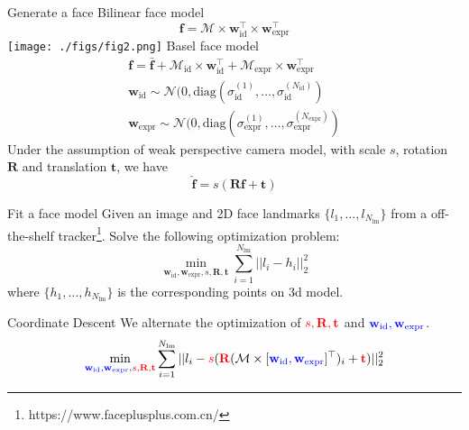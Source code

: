 \documentclass{beamer}
\begin{document}
\begin{frame}[allowframebreaks]{Generate a face}
Bilinear face model\cite{vlasic2005face}
$$\mathbf{f} = \mathcal{M} \times \mathbf{w}_{\text{id}}^\top \times \mathbf{w}_{\text{expr}}^\top$$
\texttt{[image: ./figs/fig2.png]}
Basel face model\cite{gerig2017morphable}
\begin{align*}
\mathbf{f} = \bar{\mathbf{f}} + \mathcal{M}_{\text{id}} \times \mathbf{w}_{\text{id}}^\top + \mathcal{M}_{\text{expr}}\times \mathbf{w}_{\text{expr}}^\top \\
\mathbf{w}_{\text{id}} \sim \mathcal{N}(0, \text{diag}(\sigma_{\text{id}}^{(1)}, \dots, \sigma_{\text{id}}^{(N_\text{id})}) \\ 
\mathbf{w}_{\text{expr}} \sim \mathcal{N}(0, \text{diag}(\sigma_{\text{expr}}^{(1)}, \dots, \sigma_{\text{expr}}^{(N_\text{expr})})
\end{align*}
Under the assumption of weak perspective camera model, with scale $s$, rotation $\mathbf{R}$ and translation $\mathbf{t}$, we have 
$$\hat{\mathbf{f}} = s (\mathbf{R} \mathbf{f} + \mathbf{t})$$

\end{frame}

\begin{frame}{Fit a face model}
Given an image and 2D face landmarks $\{l_1, \dots, l_{N_{\text{lm}}}\}$ from a off-the-shelf tracker\footnote{https://www.faceplusplus.com.cn/}. Solve the following optimization problem:
$$\min_{\mathbf{w}_{\text{id}}, \mathbf{w}_{\text{expr}}, s, \mathbf{R}, \mathbf{t}} \sum_{i=1}^{N_{\text{lm}}}||l_i - h_i||_2^2$$
where $\{h_1, \dots, h_{N_{\text{lm}}}\}$ is the corresponding points on 3d model.


\end{frame}


\begin{frame}{Coordinate Descent}
We alternate the optimization of $\color{red}{s, \mathbf{R}, \mathbf{t}}$ and $\color{blue}{\mathbf{w}_{\text{id}}, \mathbf{w}_{\text{expr}}}$.
$$\min_{\color{blue}{\mathbf{w}_{\text{id}}, \mathbf{w}_{\text{expr}}}, \color{red}{s, \mathbf{R}, \mathbf{t}}} \sum_{i=1}^{N_{\text{lm}}}||l_i - \color{red}{s}\color{black}(\color{red}\mathbf{R}\color{black}(\mathcal{M} \times [\color{blue}{\mathbf{w}_{\text{id}}, \mathbf{w}_{\text{expr}}} \color{black}]^\top)_i + \color{red}{\mathbf{t}} \color{black})||_2^2$$
\end{frame}
\end{document}
